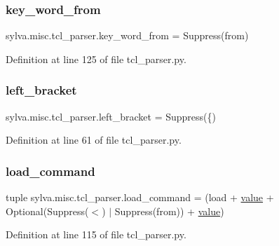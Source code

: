 \subsubsection{\texorpdfstring{key\+\_\+word\+\_\+from}{key\_word\_from}}
{\footnotesize\ttfamily sylva.\+misc.\+tcl\+\_\+parser.\+key\+\_\+word\+\_\+from = Suppress(\textquotesingle{}from\textquotesingle{})}



Definition at line 125 of file tcl\+\_\+parser.\+py.

\mbox{\label{namespacesylva_1_1misc_1_1tcl__parser_a9da481e2e9eb38c1443d778d3f18a4d3}} 
\subsubsection{\texorpdfstring{left\+\_\+bracket}{left\_bracket}}
{\footnotesize\ttfamily sylva.\+misc.\+tcl\+\_\+parser.\+left\+\_\+bracket = Suppress(\textquotesingle{}\{\textquotesingle{})}



Definition at line 61 of file tcl\+\_\+parser.\+py.

\mbox{\label{namespacesylva_1_1misc_1_1tcl__parser_a31cbff9e620c0f82c424f20ea7e70ecb}} 
\subsubsection{\texorpdfstring{load\+\_\+command}{load\_command}}
{\footnotesize\ttfamily tuple sylva.\+misc.\+tcl\+\_\+parser.\+load\+\_\+command = (load + \hyperlink{namespacesylva_1_1misc_1_1tcl__parser_a83a1a4d978bc1a8a1bd92f71b754bad9}{value} + Optional(Suppress(\textquotesingle{}$<$\textquotesingle{}) $\vert$ Suppress(\textquotesingle{}from\textquotesingle{})) + \hyperlink{namespacesylva_1_1misc_1_1tcl__parser_a83a1a4d978bc1a8a1bd92f71b754bad9}{value})}



Definition at line 115 of file tcl\+\_\+parser.\+py.

